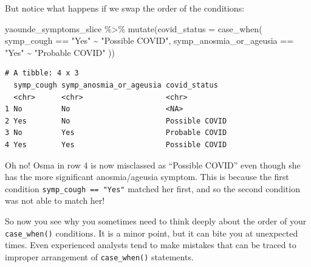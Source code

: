 \documentclass[
  letterpaper,
  DIV=11,
  numbers=noendperiod]{scrreprt}
\newenvironment{Shaded}{\begin{snugshade}}{\end{snugshade}}
\newcommand{\AttributeTok}[1]{\textcolor[rgb]{0.40,0.45,0.13}{#1}}
\newcommand{\FunctionTok}[1]{\textcolor[rgb]{0.28,0.35,0.67}{#1}}
\newcommand{\NormalTok}[1]{\textcolor[rgb]{0.00,0.23,0.31}{#1}}
\newcommand{\SpecialCharTok}[1]{\textcolor[rgb]{0.37,0.37,0.37}{#1}}
\newcommand{\StringTok}[1]{\textcolor[rgb]{0.13,0.47,0.30}{#1}}
\begin{document}
But notice what happens if we swap the order of the conditions:

\begin{Shaded}
\begin{Highlighting}[]
\NormalTok{yaounde\_symptoms\_slice }\SpecialCharTok{\%\textgreater{}\%} 
  \FunctionTok{mutate}\NormalTok{(}\AttributeTok{covid\_status =} \FunctionTok{case\_when}\NormalTok{(}
\NormalTok{    symp\_cough }\SpecialCharTok{==} \StringTok{"Yes"}  \SpecialCharTok{\textasciitilde{}} \StringTok{"Possible COVID"}\NormalTok{,}
\NormalTok{    symp\_anosmia\_or\_ageusia }\SpecialCharTok{==} \StringTok{"Yes"} \SpecialCharTok{\textasciitilde{}} \StringTok{"Probable COVID"}
\NormalTok{    ))}
\end{Highlighting}
\end{Shaded}

\begin{verbatim}
# A tibble: 4 x 3
  symp_cough symp_anosmia_or_ageusia covid_status  
  <chr>      <chr>                   <chr>         
1 No         No                      <NA>          
2 Yes        No                      Possible COVID
3 No         Yes                     Probable COVID
4 Yes        Yes                     Possible COVID
\end{verbatim}

Oh no! Osma in row 4 is now misclassed as ``Possible COVID'' even though
she has the more significant anosmia/ageusia symptom. This is because
the first condition \texttt{symp\_cough\ ==\ "Yes"} matched her first,
and so the second condition was not able to match her!

So now you see why you sometimes need to think deeply about the order of
your \texttt{case\_when()} conditions. It is a minor point, but it can
bite you at unexpected times. Even experienced analysts tend to make
mistakes that can be traced to improper arrangement of
\texttt{case\_when()} statements.
\end{document}
